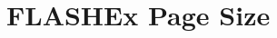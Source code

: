 \hypertarget{group___f_l_a_s_h_ex___page___size}{}\section{F\+L\+A\+S\+H\+Ex Page Size}
\label{group___f_l_a_s_h_ex___page___size}
